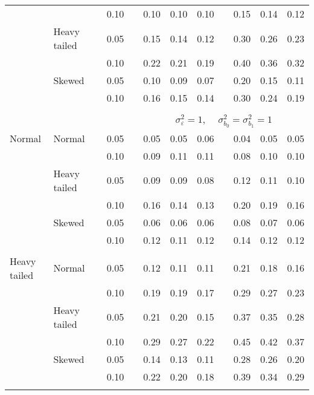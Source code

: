 \begin{table}[ht]
\begin{scriptsize}
\begin{tabular}{ll p{.1cm} c p{.1cm} rrr p{.1cm} rrr}
             &              && 0.10 &&  0.10 & 0.10 & 0.10 && 0.15 & 0.14 & 0.12 \\ 
             & Heavy tailed && 0.05 &&  0.15 & 0.14 & 0.12 && 0.30 & 0.26 & 0.23 \\ 
             &              && 0.10 &&  0.22 & 0.21 & 0.19 && 0.40 & 0.36 & 0.32 \\ 
             & Skewed       && 0.05 &&  0.10 & 0.09 & 0.07 && 0.20 & 0.15 & 0.11 \\ 
             &              && 0.10 &&  0.16 & 0.15 & 0.14 && 0.30 & 0.24 & 0.19 \\ 

&&&&&&&&&&&\\
& && && \multicolumn{7}{c}{$\sigma_{\varepsilon}^2 = 1$, \ \ $\sigma_{b_0}^2 = \sigma_{b_1}^2 = 1$} \\ \cline{6-12}
\rowcolor{gray!20}Normal       & Normal       && 0.05 &&  0.05 & 0.05 & 0.06 && 0.04 & 0.05 & 0.05 \\ 
\rowcolor{gray!20}             &              && 0.10 &&  0.09 & 0.11 & 0.11 && 0.08 & 0.10 & 0.10 \\ 
\rowcolor{gray!20}             & Heavy tailed && 0.05 &&  0.09 & 0.09 & 0.08 && 0.12 & 0.11 & 0.10 \\ 
\rowcolor{gray!20}             &              && 0.10 &&  0.16 & 0.14 & 0.13 && 0.20 & 0.19 & 0.16 \\ 
\rowcolor{gray!20}             & Skewed       && 0.05 &&  0.06 & 0.06 & 0.06 && 0.08 & 0.07 & 0.06 \\ 
\rowcolor{gray!20}             &              && 0.10 &&  0.12 & 0.11 & 0.12 && 0.14 & 0.12 & 0.12 \\ 
             &&&&&&&&&&&\\
Heavy tailed & Normal       && 0.05 &&  0.12 & 0.11 & 0.11 && 0.21 & 0.18 & 0.16 \\ 
             &              && 0.10 &&  0.19 & 0.19 & 0.17 && 0.29 & 0.27 & 0.23 \\ 
             & Heavy tailed && 0.05 &&  0.21 & 0.20 & 0.15 && 0.37 & 0.35 & 0.28 \\ 
             &              && 0.10 &&  0.29 & 0.27 & 0.22 && 0.45 & 0.42 & 0.37 \\ 
             & Skewed       && 0.05 &&  0.14 & 0.13 & 0.11 && 0.28 & 0.26 & 0.20 \\ 
             &              && 0.10 &&  0.22 & 0.20 & 0.18 && 0.39 & 0.34 & 0.29 \\ 
             &&&&&&&&&&&\\

\end{tabular}
\end{scriptsize}
\end{table}
